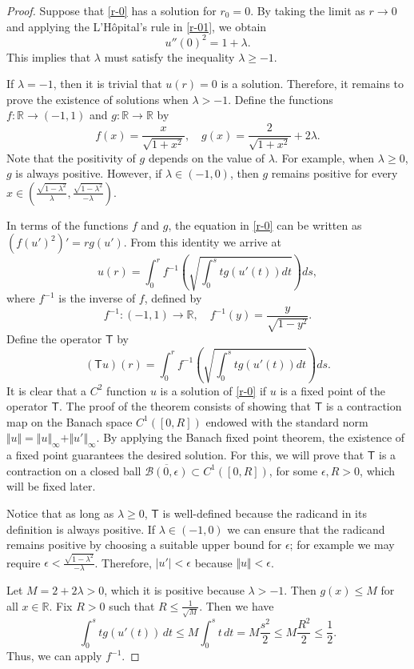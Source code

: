 \documentclass[12pt]{amsart}
\def\r{\mathbb R}
\def\t{\mathsf T}
\theoremstyle{definition}
\begin{document}
\begin{proof}
Suppose that \eqref{r-0} has a solution for $r_0=0$. By taking the limit as $r\to 0$ and applying the L'H\^{o}pital's rule in \eqref{r-01}, we obtain
$$u''(0)^2= 1+\lambda.$$
This implies that $\lambda$ must satisfy the inequality  $\lambda\geq -1$. 

If $\lambda=-1$, then it is trivial that $u(r)=0$ is a solution. 
Therefore, it remains to prove the existence of solutions when $\lambda>-1$. Define the functions   $f\colon\r\to (-1,1)$ and $g:  \r \to  \r$ by
$$
f(x)=\frac{x}{\sqrt{1+x^2}}, \quad g(x)=\frac{2}{\sqrt{1+x^2}}+2\lambda.
$$
Note that the positivity of $g$ depends on the value of $\lambda$. For example, when $\lambda \geq 0$, $g$ is always positive. However, if $\lambda \in (-1,0)$, then $g$ remains positive for every $x \in (\frac{\sqrt{1-\lambda^2}}{\lambda},\frac{\sqrt{1-\lambda^2}}{-\lambda})$.

In terms of the functions $f$ and $g$, the equation in \eqref{r-0} can be written as $(f(u')^2)'=rg(u')$. From this identity   we arrive at
\begin{equation}\label{u3}
u(r)= \int_0^r f^{-1} \left (\sqrt{\int_0^s tg(u'(t))dt }\right)ds,
\end{equation}
where $f^{-1}$ is the inverse of $f$, defined by 
$$f^{-1}\colon (-1,1)\to\r, \quad f^{-1}(y)=\frac{y}{\sqrt{1-y^2}}.$$
Define the operator $\t$ by
$$
(\t u)(r)=\int_0^r f^{-1} \left (\sqrt{\int_0^s tg(u'(t))dt }\right)ds.
$$
It is clear that a $C^2$ function $u$ is a solution of \eqref{r-0} if $u$ is a fixed point of the operator $\t$. The proof of the theorem consists of showing that $\t$ is a contraction map on the Banach space $C^1([0,R])$   endowed with the standard norm $\Vert u \Vert = \Vert u \Vert_\infty + \Vert u' \Vert_\infty$. By applying the Banach fixed point theorem, the existence of a fixed point  guarantees the desired solution. For this, we will prove that $\t$ is a   contraction on a closed ball $\overline{\mathcal{B}(0,\epsilon )} \subset C^1([0,R])$, for some $\epsilon,R>0$, which   will be fixed later.    

Notice that as long as $\lambda \geq 0$, $\t$ is well-defined because the radicand in its definition is always positive. If $\lambda \in (-1,0)$ we can ensure that the radicand remains positive by choosing a suitable upper bound for $\epsilon$; for example we may require $\epsilon < \frac{\sqrt{1-\lambda^2}}{-\lambda}$. Therefore, $ |u' | <\epsilon$ because $\Vert u \Vert < \epsilon$.

Let $M=2+2\lambda>0$, which it is positive because $\lambda>-1$. Then  $g(x)\leq M$ for all $x\in\r$. Fix $R>0$ such that $R\leq\frac{1}{\sqrt{M}}$. Then we have
$$\int_0^stg(u'(t))\, dt\leq M\int_0^st\, dt=M\frac{s^2}{2}\leq M\frac{R^2}{2}\leq\frac12.$$
Thus, we can apply $f^{-1}$. 


\end{proof}
\end{document}
